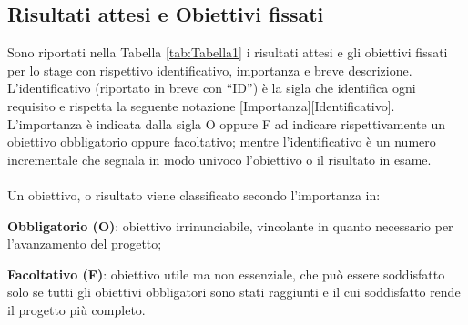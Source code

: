 \subsection{Risultati attesi e Obiettivi fissati}
Sono riportati nella Tabella \ref{tab:Tabella1} i risultati attesi e gli obiettivi fissati per lo stage con rispettivo identificativo, importanza e breve descrizione.
L'identificativo (riportato in breve con “ID”) è la sigla che identifica ogni requisito e rispetta la seguente notazione [Importanza][Identificativo]. \\
L’importanza è indicata dalla sigla O oppure F ad indicare rispettivamente un obiettivo
obbligatorio oppure facoltativo; mentre l’identificativo è un numero incrementale che
segnala in modo univoco l’obiettivo o il risultato in esame.\\
\\
Un obiettivo, o risultato viene classificato secondo l'importanza in: 
\begin{list}{*}{}
    \item \textbf{Obbligatorio (O)}: obiettivo irrinunciabile, vincolante in quanto necessario per l'avanzamento del progetto;
    \item \textbf{Facoltativo (F)}: obiettivo utile ma non essenziale, che può essere soddisfatto solo se tutti gli obiettivi obbligatori sono stati raggiunti e il cui soddisfatto rende il progetto più completo.     
\end{list} 

